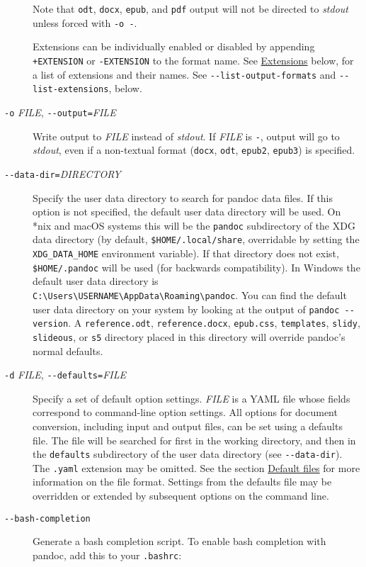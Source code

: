 \documentclass[]{article}
\begin{document}
\begin{description}
Note that \texttt{odt}, \texttt{docx}, \texttt{epub}, and \texttt{pdf}
output will not be directed to \emph{stdout} unless forced with
\texttt{-o\ -}.

Extensions can be individually enabled or disabled by appending
\texttt{+EXTENSION} or \texttt{-EXTENSION} to the format name. See
\protect\hyperlink{extensions}{Extensions} below, for a list of
extensions and their names. See \texttt{-\/-list-output-formats} and
\texttt{-\/-list-extensions}, below.
\item[\texttt{-o} \emph{FILE}, \texttt{-\/-output=}\emph{FILE}]
Write output to \emph{FILE} instead of \emph{stdout}. If \emph{FILE} is
\texttt{-}, output will go to \emph{stdout}, even if a non-textual
format (\texttt{docx}, \texttt{odt}, \texttt{epub2}, \texttt{epub3}) is
specified.
\item[\texttt{-\/-data-dir=}\emph{DIRECTORY}]
Specify the user data directory to search for pandoc data files. If this
option is not specified, the default user data directory will be used.
On *nix and macOS systems this will be the \texttt{pandoc} subdirectory
of the XDG data directory (by default, \texttt{\$HOME/.local/share},
overridable by setting the \texttt{XDG\_DATA\_HOME} environment
variable). If that directory does not exist, \texttt{\$HOME/.pandoc}
will be used (for backwards compatibility). In Windows the default user
data directory is
\texttt{C:\textbackslash{}Users\textbackslash{}USERNAME\textbackslash{}AppData\textbackslash{}Roaming\textbackslash{}pandoc}.
You can find the default user data directory on your system by looking
at the output of \texttt{pandoc\ -\/-version}. A \texttt{reference.odt},
\texttt{reference.docx}, \texttt{epub.css}, \texttt{templates},
\texttt{slidy}, \texttt{slideous}, or \texttt{s5} directory placed in
this directory will override pandoc's normal defaults.
\item[\texttt{-d} \emph{FILE}, \texttt{-\/-defaults=}\emph{FILE}]
Specify a set of default option settings. \emph{FILE} is a YAML file
whose fields correspond to command-line option settings. All options for
document conversion, including input and output files, can be set using
a defaults file. The file will be searched for first in the working
directory, and then in the \texttt{defaults} subdirectory of the user
data directory (see \texttt{-\/-data-dir}). The \texttt{.yaml} extension
may be omitted. See the section
\protect\hyperlink{default-files}{Default files} for more information on
the file format. Settings from the defaults file may be overridden or
extended by subsequent options on the command line.
\item[\texttt{-\/-bash-completion}]
Generate a bash completion script. To enable bash completion with
pandoc, add this to your \texttt{.bashrc}:


\end{description}
\end{document}
